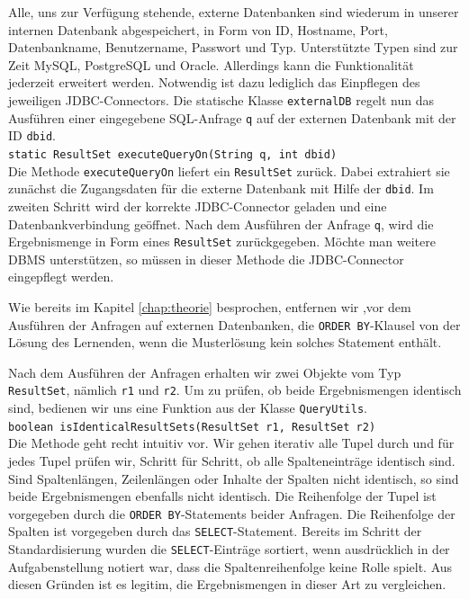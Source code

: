 Alle, uns zur Verfügung stehende, externe Datenbanken sind wiederum in unserer internen Datenbank abgespeichert, in Form von ID, Hostname, Port, Datenbankname, Benutzername, Passwort und Typ. Unterstützte Typen sind zur Zeit MySQL, PostgreSQL und Oracle. Allerdings kann die Funktionalität jederzeit erweitert werden. Notwendig ist dazu lediglich das Einpflegen des jeweiligen JDBC-Connectors. Die statische Klasse \verb|externalDB| regelt nun das Ausführen einer eingegebene SQL-Anfrage \verb|q| auf der externen Datenbank mit der ID \verb|dbid|. \\
\verb|static ResultSet executeQueryOn(String q, int dbid)|\\
Die Methode \verb|executeQueryOn| liefert ein \verb|ResultSet| zurück. Dabei extrahiert sie zunächst die Zugangsdaten für die externe Datenbank mit Hilfe der \verb|dbid|. Im zweiten Schritt wird der korrekte JDBC-Connector geladen und eine Datenbankverbindung geöffnet. Nach dem Ausführen der Anfrage \verb|q|, wird die Ergebnismenge in Form eines \verb|ResultSet| zurückgegeben. Möchte man weitere DBMS unterstützen, so müssen in dieser Methode die JDBC-Connector eingepflegt werden.

Wie bereits im Kapitel \ref{chap:theorie} besprochen, entfernen wir ,vor dem Ausführen der Anfragen auf externen Datenbanken, die \verb|ORDER BY|-Klausel von der Lösung des Lernenden, wenn die Musterlösung kein solches Statement enthält. 

Nach dem Ausführen der Anfragen erhalten wir zwei Objekte vom Typ \verb|ResultSet|, nämlich \verb|r1| und \verb|r2|. Um zu prüfen, ob beide Ergebnismengen identisch sind, bedienen wir uns eine Funktion aus der Klasse \verb|QueryUtils|.\\
\verb|boolean isIdenticalResultSets(ResultSet r1, ResultSet r2)|\\
Die Methode geht recht intuitiv vor. Wir gehen iterativ alle Tupel durch und für jedes Tupel prüfen wir, Schritt für Schritt, ob alle Spalteneinträge identisch sind. Sind Spaltenlängen, Zeilenlängen oder Inhalte der Spalten nicht identisch, so sind beide Ergebnismengen ebenfalls nicht identisch. Die Reihenfolge der Tupel ist vorgegeben durch die \verb|ORDER BY|-Statements beider Anfragen. Die Reihenfolge der Spalten ist vorgegeben durch das \verb|SELECT|-Statement. Bereits im Schritt der Standardisierung wurden die \verb|SELECT|-Einträge sortiert, wenn ausdrücklich in der Aufgabenstellung notiert war, dass die Spaltenreihenfolge keine Rolle spielt. Aus diesen Gründen ist es legitim, die Ergebnismengen in dieser Art zu vergleichen.

